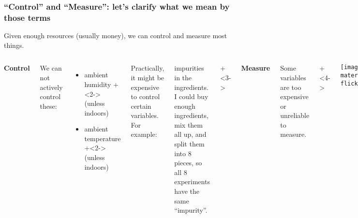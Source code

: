 \begin{frame}\frametitle{``Control'' and ``Measure'': let's clarify what we mean by those terms}
	
	{\color{myOrange}Given enough resources (usually money), we can control and measure most things.}
	
	\begin{columns}[T]
			\begin{center}\textbf{Control}\end{center}
				
			We can not actively control these:
			\begin{itemize}
				\item	ambient humidity \onslide+<2->{(unless indoors)}
				\item	ambient temperature \onslide+<2->{(unless indoors)}
			\end{itemize}
			
			\vspace{1cm}
			Practically, it might be expensive to control certain variables. For example: 
			
			impurities in the ingredients. I could buy enough
			ingredients, mix them all up, and split them into 8 pieces, so all
			8 experiments have the same ``impurity''.
		
			\onslide+<3->{
				\begin{center}\textbf{Measure}\end{center}
			
				Some variables are too expensive or unreliable to measure.
			
				\onslide+<4->{
					\begin{center}
						\texttt{[image: ../4C/Supporting materials/5937291945\_4e961c8baa\_o-flickr-humidity-modified.png]}
					\end{center}
				}
			}
			
	\end{columns}
	
\end{frame}

